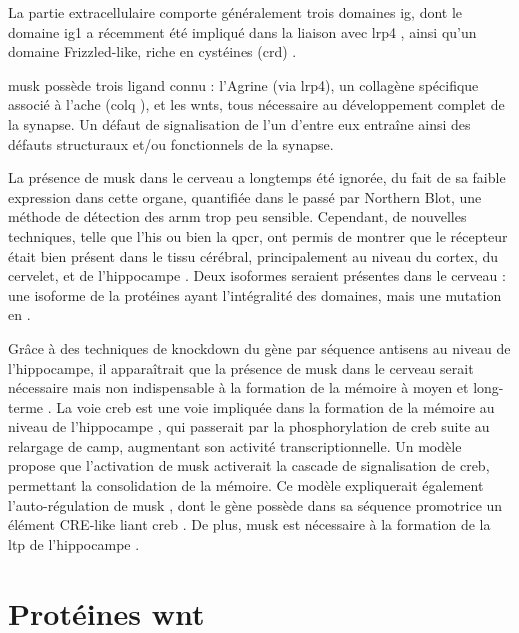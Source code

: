 	La partie extracellulaire comporte généralement trois domaines \gls{ig}, dont le domaine \gls{ig}1 a récemment été impliqué dans la liaison avec \gls{lrp}4 \cite{Zhang2011}, ainsi qu'un domaine Frizzled-like, riche en cystéines (\gls{crd}) \cite{Jing2009}.
	
	\gls{musk} possède trois ligand connu : l'Agrine (via \gls{lrp}4), un collagène spécifique associé à l'\Gls{ache} (\acrshort{colq} ), et les \Glspl{wnt}, tous nécessaire au développement complet de la synapse. Un défaut de signalisation de l'un d'entre eux entraîne ainsi des défauts structuraux et/ou fonctionnels de la synapse.
	
	La présence de \gls{musk} dans le cerveau a longtemps été ignorée, du fait de sa faible expression dans cette organe, quantifiée dans le passé par Northern Blot, une méthode de détection des \acrshort{arnm} trop peu sensible. Cependant, de nouvelles techniques, telle que l'\gls{his} ou bien la \gls{qpcr}, ont permis de montrer que le récepteur était bien présent dans le tissu cérébral, principalement au niveau du cortex, du cervelet, et de l'hippocampe \cite{Garcia-Osta2006, Ksiazek2007}. Deux isoformes seraient présentes dans le cerveau : une isoforme de la protéines ayant l'intégralité des domaines, mais une mutation en .
	
	Grâce à des techniques de knockdown du gène par séquence antisens au niveau de l'hippocampe, il apparaîtrait que la présence de \gls{musk} dans le cerveau serait nécessaire mais non indispensable à la formation de la mémoire à moyen et long-terme \cite{Garcia-Osta2006}. La voie \gls{creb} est une voie impliquée dans la formation de la mémoire au niveau de l'hippocampe \cite{Silva1998, Kandel2012,Kida2014,Ortega-Martinez2015}, qui passerait par la phosphorylation de \gls{creb} suite au relargage de \acrshort{camp}, augmentant son activité transcriptionnelle. Un modèle propose \cite{Garcia-Osta2006} que l'activation de \gls{musk} activerait la cascade de signalisation de \gls{creb}, permettant la consolidation de la mémoire. Ce modèle expliquerait également l'auto-régulation de \gls{musk} \cite{Moore2001}, dont le gène possède dans sa séquence promotrice un élément CRE-like liant \gls{creb} \cite{Kim2005}.
	De plus, \gls{musk} est nécessaire à la formation de la \gls{ltp} de l'hippocampe \cite{Garcia-Osta2006}.
	
\section{Protéines \gls{wnt}}
	\label{sec:IntroWnt}

